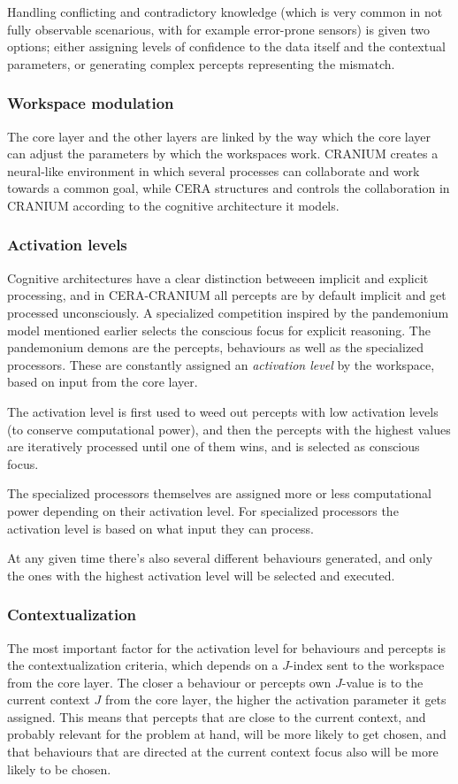 Handling conflicting and contradictory knowledge (which is very common in not
fully observable scenarious, with for example error-prone sensors) is given two
options; either assigning levels of confidence to the data itself and the
contextual parameters, or generating complex percepts representing the mismatch.

\subsubsection{Workspace modulation}
The core layer and the other layers are linked by the way which the
core layer can adjust the parameters by which the workspaces work. CRANIUM
creates a neural-like environment in which several processes can collaborate
and work towards a common goal, while CERA structures and controls the
collaboration in CRANIUM according to the cognitive architecture it models.

\subsubsection{Activation levels}
Cognitive architectures have a clear distinction betweeen implicit and explicit
processing\cite{atkinson2000consciousness}, and in CERA-CRANIUM all percepts
are by default implicit and get processed unconsciously. A specialized
competition inspired by the pandemonium model mentioned earlier selects the
conscious focus for explicit reasoning. The pandemonium demons are the
percepts, behaviours as well as the specialized processors. These are
constantly assigned an \textit{activation level} by the workspace, based on
input from the core layer.

The activation level is first used to weed out percepts with low activation
levels (to conserve computational power), and then the percepts with the highest
values are iteratively processed until one of them wins, and is selected as
conscious focus.

The specialized processors themselves are assigned more or less computational
power depending on their activation level. For specialized processors the
activation level is based on what input they can process.

At any given time there's also several different behaviours generated, and only
the ones with the highest activation level will be selected and executed.

\subsubsection{Contextualization}
The most important factor for the activation level for behaviours and percepts
is the contextualization criteria, which depends on a $J$-index sent to the
workspace from the core layer. The closer a behaviour or percepts own $J$-value
is to the current context $J$ from the core layer, the higher the activation
parameter it gets assigned. This means that percepts that are close to the
current context, and probably relevant for the problem at hand, will be more
likely to get chosen, and that behaviours that are directed at the current
context focus also will be more likely to be chosen.

